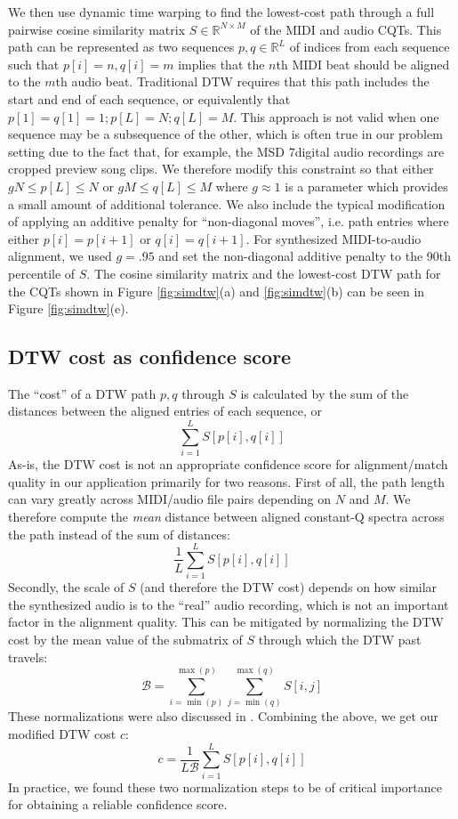 \documentclass{article}
\begin{document}
We then use dynamic time warping to find the lowest-cost path through a full pairwise cosine similarity matrix $S \in \mathbb{R}^{N \times M}$ of the MIDI and audio CQTs.
This path can be represented as two sequences $p, q \in \mathbb{R}^L$ of indices from each sequence such that $p[i] = n, q[i] = m$ implies that the $n$th MIDI beat should be aligned to the $m$th audio beat.
Traditional DTW requires that this path includes the start and end of each sequence, or equivalently that $p[1] = q[1] = 1; p[L] = N; q[L] = M$.
This approach is not valid when one sequence may be a subsequence of the other, which is often true in our problem setting due to the fact that, for example, the MSD 7digital audio recordings are cropped preview song clips.
We therefore modify this constraint so that either $gN \le p[L] \le N$ or $gM \le q[L] \le M$ where $g \approx 1$ is a parameter which provides a small amount of additional tolerance.
We also include the typical modification of applying an additive penalty for ``non-diagonal moves'', i.e. path entries where either $p[i] = p[i + 1]$ or $q[i] = q[i + 1]$.
For synthesized MIDI-to-audio alignment, we used $g = .95$ and set the non-diagonal additive penalty to the 90th percentile of $S$.
The cosine similarity matrix and the lowest-cost DTW path for the CQTs shown in Figure \ref{fig:simdtw}(a) and \ref{fig:simdtw}(b) can be seen in Figure \ref{fig:simdtw}(e).

\subsection{DTW cost as confidence score}

The ``cost'' of a DTW path $p, q$ through $S$ is calculated by the sum of the distances between the aligned entries of each sequence, or
$$
\sum_{i = 1}^L S[p[i], q[i]]
$$
As-is, the DTW cost is not an appropriate confidence score for alignment/match quality in our application primarily for two reasons.
First of all, the path length can vary greatly across MIDI/audio file pairs depending on $N$ and $M$.
We therefore compute the \textit{mean} distance between aligned constant-Q spectra across the path instead of the sum of distances:
$$
\frac{1}{L}\sum_{i = 1}^L S[p[i], q[i]]
$$
Secondly, the scale of $S$ (and therefore the DTW cost) depends on how similar the synthesized audio is to the ``real'' audio recording, which is not an important factor in the alignment quality.
This can be mitigated by normalizing the DTW cost by the mean value of the submatrix of $S$ through which the DTW past travels:
$$
\mathcal{B} = \sum_{i = \min(p)}^{\max(p)} \sum_{j = \min(q)}^{\max(q)} S[i, j] 
$$
These normalizations were also discussed in \cite{hu2003polyphonic}.
Combining the above, we get our modified DTW cost $c$:
$$
c = \frac{1}{L \mathcal{B}} \sum_{i = 1}^L S[p[i], q[i]]
$$
In practice, we found these two normalization steps to be of critical importance for obtaining a reliable confidence score.
\end{document}
